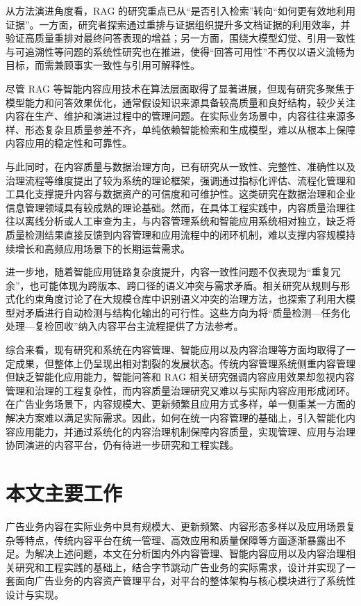 从方法演进角度看，RAG 的研究重点已从“是否引入检索”转向“如何更有效地利用证据”。一方面，研究者探索通过重排与证据组织提升多文档证据的利用效率，并验证高质量重排对最终问答表现的增益\cite{yu2024rankrag,pradeep2022squeezing}；另一方面，围绕大模型幻觉、引用一致性与可追溯性等问题的系统性研究也在推进，使得“回答可用性”不再仅以语义流畅为目标，而需兼顾事实一致性与引用可解释性\cite{huang2025survey}。

尽管 RAG 等智能内容应用技术在算法层面取得了显著进展，但现有研究多聚焦于模型能力和问答效果优化，通常假设知识来源具备较高质量和良好结构，较少关注内容在生产、维护和演进过程中的管理问题\cite{fan2024survey}。在实际业务场景中，内容往往来源多样、形态复杂且质量参差不齐，单纯依赖智能检索和生成模型，难以从根本上保障内容应用的稳定性和可靠性\cite{sillaber2019experience}。

与此同时，在内容质量与数据治理方向，已有研究从一致性、完整性、准确性以及治理流程等维度提出了较为系统的理论框架，强调通过指标化评估、流程化管理和工具化支撑提升内容与数据资产的可信度和可维护性\cite{mahanti2019data,kumar2025exploring}。这类研究在数据治理和企业信息管理领域具有较成熟的理论基础。然而，在具体工程实践中，内容质量治理往往以离线分析或人工审查为主，与内容管理系统和智能应用系统相对独立，缺乏将质量检测结果直接反馈到内容管理和应用流程中的闭环机制，难以支撑内容规模持续增长和高频应用场景下的长期运营需求\cite{kulmukhametov2021improving}。

进一步地，随着智能应用链路复杂度提升，内容一致性问题不仅表现为“重复冗余”，也可能体现为跨版本、跨口径的语义冲突与需求矛盾。相关研究从规则与形式化约束角度讨论了在大规模仓库中识别语义冲突的治理方法，也探索了利用大模型对矛盾进行自动检测与结构化输出的可行性\cite{kulmukhametov2021improving,gartner2024automated}。这些方向为将“质量检测—任务化处理—复检回收”纳入内容平台主流程提供了方法参考。

综合来看，现有研究和系统在内容管理、智能应用以及内容治理等方面均取得了一定成果，但整体上仍呈现出相对割裂的发展状态。传统内容管理系统侧重内容管理但缺乏智能化应用能力，智能问答和 RAG 相关研究强调内容应用效果却忽视内容管理和治理的工程复杂性，而内容质量治理研究又难以与实际内容应用形成闭环。在广告业务场景下，内容规模大、更新频繁且应用方式多样，单一侧重某一方面的解决方案难以满足实际需求。因此，如何在统一内容管理的基础上，引入智能化内容应用能力，并通过系统化的内容治理机制保障内容质量，实现管理、应用与治理协同演进的内容平台，仍有待进一步研究和工程实践。

\section{本文主要工作}
广告业务内容在实际业务中具有规模大、更新频繁、内容形态多样以及应用场景复杂等特点，传统内容平台在统一管理、高效应用和质量保障等方面逐渐暴露出不足。为解决上述问题，本文在分析国内外内容管理、智能内容应用以及内容治理相关研究和工程实践的基础上，结合字节跳动广告业务的实际需求，设计并实现了一套面向广告业务的内容资产管理平台，对平台的整体架构与核心模块进行了系统性设计与实现。

